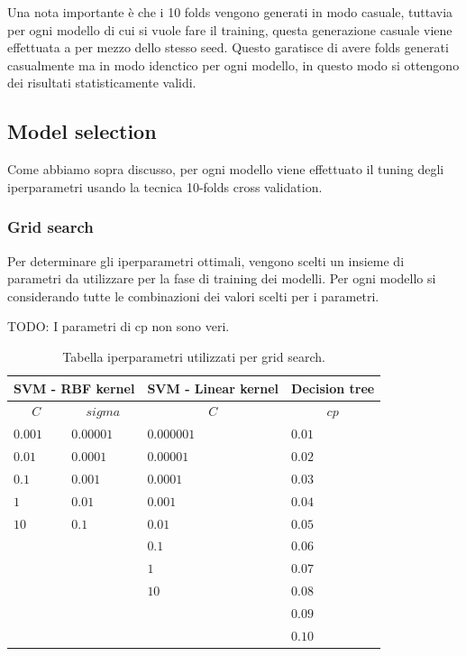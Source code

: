 Una nota importante è che i 10 folds vengono generati in modo casuale, tuttavia per ogni modello di cui si vuole fare il training, questa generazione casuale viene effettuata a per mezzo dello stesso seed. Questo garatisce di avere folds generati casualmente ma in modo idenctico per ogni modello, in questo modo si ottengono dei risultati statisticamente validi.

\subsection{Model selection}
\label{sec:mode_selection}
Come abbiamo sopra discusso, per ogni modello viene effettuato il tuning degli iperparametri usando la tecnica 10-folds cross validation.

\subsubsection{Grid search}
\label{sec:grid-search}
Per determinare gli iperparametri ottimali, vengono scelti un insieme di parametri da utilizzare per la fase di training dei modelli. Per ogni modello si considerando tutte le combinazioni dei valori scelti per i parametri.


TODO: I parametri di cp non sono veri.
\begin{table}[H]
	
	\begin{center}
		
		\begin{tabular}{| l | l | l | l |}
			\hline
			\multicolumn{2}{|c|}{\textbf{SVM -  RBF kernel}} &
			\multicolumn{1}{|c|}{\textbf{SVM - Linear kernel}} &
			\multicolumn{1}{c|}{\textbf{Decision tree}}\\
			\hline
			\hline
			\multicolumn{1}{|c}{$C$} &
			\multicolumn{1}{c|}{$sigma$} &
			\multicolumn{1}{c|}{$C$ } &
			\multicolumn{1}{c|}{$cp$}\\
			\hline
			
			$0.001$	 & $0.00001$    & $0.000001$ & $0.01$\\
			$0.01$	  & $0.0001$      &$0.00001$	& $0.02$\\
			$0.1$	   & $0.001$      	&$0.0001$	   & $0.03$\\
			$1$			& $0.01$      	  &$0.001$		  & $0.04$\\
			$10$	   & $0.1$      	  &$0.01$		   & $0.05$\\
				   		   &       	  &$0.1$							   & $0.06$\\
				   	 	   &       	  &$1$									& $0.07$\\
				  		   &       	  &$10$								   & $0.08$\\
						   &       	  &										  & $0.09$\\
						   &       	  & 									  & $0.10$\\
			\hline
		\end{tabular}
		
	\end{center}
	\caption{Tabella iperparametri utilizzati per grid search.}
\end{table}


